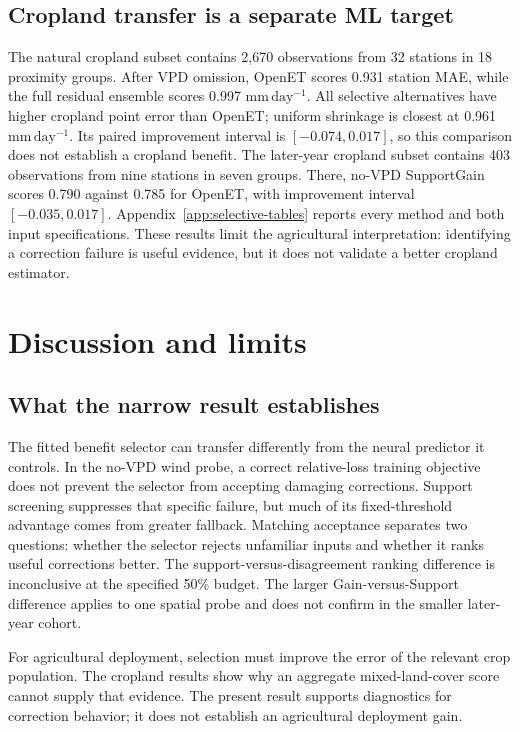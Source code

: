 \documentclass[10pt,letterpaper]{article}
\newcommand{\unit}{\mathrm{mm\,day^{-1}}}
\begin{document}
\subsection{Cropland transfer is a separate ML target}
The natural cropland subset contains 2,670 observations from 32 stations in 18 proximity groups.
After VPD omission, OpenET scores 0.931 station MAE, while the full residual ensemble scores 0.997 $\unit$.
All selective alternatives have higher cropland point error than OpenET; uniform shrinkage is closest at 0.961 $\unit$.
Its paired improvement interval is $[-0.074,0.017]$, so this comparison does not establish a cropland benefit.
The later-year cropland subset contains 403 observations from nine stations in seven groups.
There, no-VPD SupportGain scores 0.790 against 0.785 for OpenET, with improvement interval $[-0.035,0.017]$.
Appendix~\ref{app:selective-tables} reports every method and both input specifications.
These results limit the agricultural interpretation: identifying a correction failure is useful evidence, but it does not validate a better cropland estimator.

\section{Discussion and limits}
\subsection{What the narrow result establishes}
The fitted benefit selector can transfer differently from the neural predictor it controls.
In the no-VPD wind probe, a correct relative-loss training objective does not prevent the selector from accepting damaging corrections.
Support screening suppresses that specific failure, but much of its fixed-threshold advantage comes from greater fallback.
Matching acceptance separates two questions: whether the selector rejects unfamiliar inputs and whether it ranks useful corrections better.
The support-versus-disagreement ranking difference is inconclusive at the specified 50\% budget.
The larger Gain-versus-Support difference applies to one spatial probe and does not confirm in the smaller later-year cohort.

For agricultural deployment, selection must improve the error of the relevant crop population.
The cropland results show why an aggregate mixed-land-cover score cannot supply that evidence.
The present result supports diagnostics for correction behavior; it does not establish an agricultural deployment gain.
\end{document}
